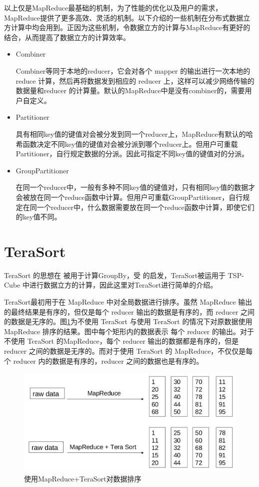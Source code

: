 以上仅是MapReduce最基础的机制，为了性能的优化以及用户的需求，MapReduce提供了更多高效、灵活的机制。以下介绍的一些机制在分布式数据立方计算中均会用到。正因为这些机制，令数据立方的计算与MapReduce有更好的结合，从而提高了数据立方的计算效率。

\begin{itemize}

\item Combiner

Combiner等同于本地的reducer，它会对各个 mapper 的输出进行一次本地的 reduce 计算，然后再将数据发到相应的 reducer 上，这样可以减少网络传输的数据量和reducer 的计算量。默认的MapReduce中是没有combiner的，需要用户自定义。

\item Partitioner

具有相同key值的键值对会被分发到同一个reducer上，MapReduce有默认的哈希函数决定不同key值的键值对会被分派到哪个reducer上。但用户可重载Partitioner，自行规定数据的分派。因此可指定不同key值的键值对的分派。

\item GroupPartitioner

在同一个reducer中，一般有多种不同key值的键值对，只有相同key值的数据才会被放在同一个reduce函数中计算。但用户可重载GroupPartitioner，自行规定在同一个reducer中，什么数据需要放在同一个reduce函数中计算，即使它们的key值不同。

\end{itemize}




\section{TeraSort}

TeraSort\cite{o2008terabyte} 的思想在\cite{tao2013minimal} 被用于计算GroupBy，受\cite{tao2013minimal} 的启发，TeraSort被运用于 TSP-Cube 中进行数据立方的计算，因此这里对TeraSort进行简单的介绍。

TeraSort最初用于在 MapReduce 中对全局数据进行排序。虽然 MapReduce 输出的最终结果是有序的，但仅是每个 reducer 输出的数据是有序的，而 reducer 之间的数据是无序的。图\ref{tera_sort}为不使用 TeraSort 与使用 TeraSort 的情况下对原数据使用 MapReduce 排序的结果。图中每个矩形内的数据表示 每个 reducer 的输出。对于不使用 TeraSort 的MapReduce，每个 reducer 输出的数据都是有序的，但是reducer 之间的数据是无序的。而对于使用 TeraSort 的 MapReduce，不仅仅是每个 reducer 内的数据是有序的，reducer 之间的数据也是有序的。

\begin{figure}[ht] 
\centering\includegraphics[width=4.5in]{picture/ch_terasort_mr/tera_sort} 
\caption{使用MapReduce+TeraSort对数据排序}\label{tera_sort} 
\end{figure}

